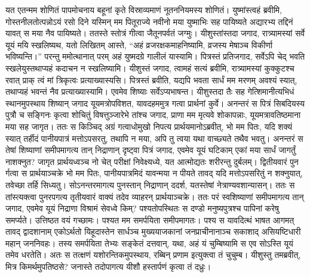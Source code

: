 \vakya यत एतन्मम शोणितं पापमोचनाय बहूनां कृते विस्राव्यमाणं नूतननियमस्य शोणितं।
\vakya युष्मांस्त्वहं ब्रवीमि, गोस्तनीलतोत्पन्नोऽयं रसो दिने यस्मिन् मम पितूराज्ये नवीनो मया युष्माभिः सह पायिष्यते अद्यारभ्य तद्दिनं यावत् स मया नैव पायिष्यते।
\vakya ततस्ते स्तोत्रं गीत्वा जैतूनपर्वतं जग्मुः।
\vakya यीशुस्तांस्तदा जगाद, रात्र्यामस्यां सर्वे यूयं मयि स्खलिष्यथ, यतो लिखितम् आस्ते, “अहं व्रजरक्षकमाहनिष्यामि, व्रजस्य मेषाञ्च विकीर्णा भविष्यन्ति।”
\vakya परन्तु ममोत्थानात् परम् अहं युष्मदग्रे गालीलं यास्यामि।
\vakya पित्रस्तं प्रतिजगाद, सर्वेऽपि चेद् भवति स्खलेयुस्तथाप्यहं कदाचन न स्खलिष्यामि।
\vakya यीशुस्तं जगाद, त्वामहं सत्यं ब्रवीमि, रात्र्यामस्यां कुक्कुटश्च रवात् प्राक् त्वं मां त्रिकृत्वः प्रत्याख्यास्यसि।
\vakya पित्रस्तं ब्रवीति, यद्यपि भवता सार्धं मम मरणम् अवश्यं स्यात्, तथाप्यहं भवन्तं नैव प्रत्याख्यास्यामि। एवमेव शिष्याः सर्वेऽप्यभाषन्त।
\vakya यीशुस्तदा तैः सह गेत्शिमानीत्यभिधं स्थानमुपस्थाय शिष्यान् जगाद यूयमत्रोपविशत, यावदहममुत्र गत्वा प्रार्थनां कुर्वे।
\vakya अनन्तरं स पित्रं सिबदियस्य पुत्रौ च सङ्गिनः कृत्वा शोचितुं विषत्तुञ्जारेभे तांश्च जगाद,
\vakya प्राणा मम मृत्यवे शोकापन्नाः, यूयमत्रावतिष्ठमाना मया सह जागृत।
\vakya ततः स किञ्चिद् अग्रं गत्वाधोमुखो निपत्य प्रार्थयमानोऽब्रवीत्, भो मम पितः, यदि शक्यं स्यात् तर्हीदं पानीयपात्रं मत्तोऽपसरतु, तथापि न मया, अपि तु त्वया यथा वाच्छ्यते तथैव भवतु।
\vakya अनन्तरं स तेषां शिष्याणां समीपमागत्य तान् निद्राणान् दृष्ट्वा पित्रं जगाद, एवमेव यूयं घटिकाम् एकां मया सार्धं जागर्तुं नाशक्नुत?
\vakya जागृत प्रार्थयध्वञ्च नो चेत् परीक्षां निवेक्ष्यध्ये, यत आत्मोद्यतः शरीरन्तु दुर्बलम्।
\vakya द्वितीयवारं पुन र्गत्वा स प्रार्थयाञ्चक्रे भो मम पितः, पानीयपात्रमिदं यावन्मया न पीयते तावद् यदि मत्तोऽपसरितुं न शक्नुयात्, तवेच्छा तर्हि सिध्यतु।
\vakya सोऽनन्तरमागत्य पुनस्तान् निद्राणान् ददर्श, यतस्तेषां नेत्राण्यवशान्यासन्।
\vakya ततः स तांस्त्यक्त्वा पुनरपगत्य तृतीयवारं वाक्यं तदेव व्याहरन् प्रार्थयाञ्चक्रे।
\vakya ततः परं स्वशिष्याणां समीपमागत्य तान् जगाद, एवमेव यूयं निद्राणा विश्रामं सेवध्वे किम्? पश्यतोपस्थितः स दण्डो मनुष्यपुत्रश्च पापिनां करेषु समर्प्यते।
\vakya उत्तिष्ठत वयं गच्छामः। पश्यत मम समर्पयिता समीपमागतः।
\vakya पश्य स यावदित्थं भाषत आगमत् तावद् द्वादशानाम् एकोऽर्थतो यिहूदास्तेन सार्धञ्च मुख्ययाजकानां जनप्राचीनानाञ्च सकाशाद् असियष्टिधारी महान् जननिवहः।
\vakya तस्य समर्पयिता तेभ्यः सङ्केतं दत्तवान्, यथा, अहं यं चुम्बिष्यामि स एव सोऽस्ति यूयं तमेव धरतेति।
\vakya अतः स तत्क्षणं यशोरन्तिकमुपस्थाय, रब्बिन् प्रणाम इत्युक्त्वा तं चुचुम्ब।
\vakya यीशुस्तु तमब्रवीत्, मित्र किमर्थमुपतिष्ठसे? जनास्ते तदोपागत्य यीशौ हस्तार्पणं कृत्वा तं दध्रुः।
